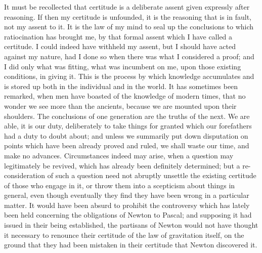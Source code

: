It must be recollected that certitude is a deliberate assent given
expressly after reasoning. If then my certitude is unfounded, it is
the reasoning that is in fault, not my assent to it. It is the law of
my mind to seal up the conclusions to which ratiocination has brought
me, by that formal assent which I have called a certitude. I could
indeed have withheld my assent, but I should have acted against my
nature, had I done so when there was what I considered a proof; and I
did only what was fitting, what was incumbent on me, upon those
existing conditions, in giving it. This is the process by which
knowledge accumulates and is stored up both in the individual and in
the world. It has sometimes been remarked, when men have boasted of
the knowledge of modern times, that no wonder we see more than the
ancients, because we are mounted upon their shoulders. The conclusions
of one generation are the truths of the next. We are able, it is our
duty, deliberately to take things for granted which our forefathers
had a duty to doubt about; and unless we summarily put down
disputation on points which have been already proved and ruled, we
shall waste our time, and make no advances. Circumstances indeed may
arise, when a question may legitimately be revived, which has
already been definitely determined; but a re-consideration of such a
question need not abruptly unsettle the existing certitude of those
who engage in it, or throw them into a scepticism about things in
general, even though eventually they find they have been wrong in a
particular matter. It would have been absurd to prohibit the
controversy which has lately been held concerning the obligations of
Newton to Pascal; and supposing it had issued in their being
established, the partisans of Newton would not have thought it
necessary to renounce their certitude of the law of gravitation
itself, on the ground that they had been mistaken in their certitude
that Newton discovered it.

